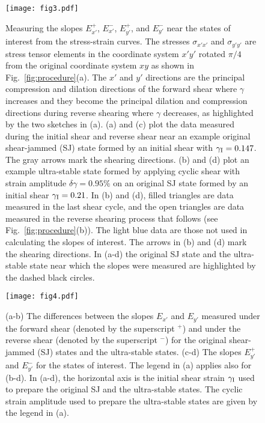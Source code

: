 \documentclass[twocolumn,showkeys,superscriptaddress,preprintnumbers,amsmath,amssymb,showpacs,prx,longbibliography]{revtex4-2}
\begin{document}
\begin{CJK*}{UTF8}{gbsn}
\begin{figure}[th]
    \centering
    \texttt{[image: fig3.pdf]}
    \caption{Measuring the slopes $E_{x'}^+$, $E_{x'}^-$, $E_{y'}^+$, and $E_{y'}^-$ near the states of interest from the stress-strain curves. The stresses $\sigma_{x'x'}$ and $\sigma_{y'y'}$ are stress tensor elements in the coordinate system $x'y'$ rotated $\pi/4$ from the original coordinate system $xy$ as shown in Fig.~\ref{fig:procedure}(a). 
    The $x'$ and $y'$ directions are the principal compression and dilation directions of the forward shear where $\gamma$ increases and they become the principal dilation and compression directions during reverse shearing where $\gamma$ decreases, as highlighted by the two sketches in (a). (a) and (c) plot the data measured during the initial shear and reverse shear near an example original shear-jammed (SJ) state formed by an initial shear with $\gamma_{\rm I} = 0.147$. The gray arrows mark the shearing directions. (b) and (d) plot an example ultra-stable state formed by applying cyclic shear with strain amplitude $\delta\gamma = 0.95\%$ on an original SJ state formed by an initial shear $\gamma_{\rm I} = 0.21$. In (b) and (d), filled triangles are data measured in the last shear cycle, and the open triangles are data measured in the reverse shearing process that follows (see Fig.~\ref{fig:procedure}(b)). The light blue data are those not used in calculating the slopes of interest. The arrows in (b) and (d) mark the shearing directions. In (a-d) the original SJ state and the ultra-stable state near which the slopes were measured are highlighted by the dashed black circles.}
    \label{fig:stress-strain-curves}
\end{figure}

\begin{figure}[th]
    \centering
    \texttt{[image: fig4.pdf]}
    \caption{(a-b) The differences between the slopes $E_{x'}$ and $E_{y'}$ measured under the forward shear (denoted by the superscript $^+$) and under the reverse shear (denoted by the superscript $^-$) for the original shear-jammed (SJ) states and the ultra-stable states. (c-d) The slopes $E_{y'}^+$ and $E_{y'}^-$ for the states of interest.  The legend in (a) applies also for (b-d). In (a-d), the horizontal axis is the initial shear strain $\gamma_{\rm I}$ used to prepare the original SJ and the ultra-stable states. The cyclic strain amplitude used to prepare the ultra-stable states are given by the legend in (a).}
    \label{fig:moduli}
\end{figure}


\end{CJK*}
\end{document}
